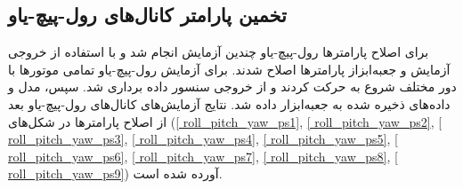 \subsection{تخمین پارامتر کانال‌های رول-پیچ-یاو}
برای اصلاح پارامترها رول-پیچ-یاو چندین آزمایش انجام شد و با استفاده از خروجی آزمایش و جعبه‌ابزاز
پارامترها اصلاح شدند.
برای آزمایش رول-پیچ-یاو تمامی موتورها با دور مختلف شروع به حرکت کردند و از خروجی سنسور داده برداری شد. سپس، مدل و  داده‌های ذخیره شده به جعبه‌ابزار
داده شد. نتایج آزمایش‌های کانال‌های رول-پیچ-یاو بعد از اصلاح پارامترها در شکل‌های
(\ref{ roll_pitch_yaw_ps1}, \ref{ roll_pitch_yaw_ps2}, \ref{ roll_pitch_yaw_ps3}, \ref{ roll_pitch_yaw_ps4}, \ref{ roll_pitch_yaw_ps5}, \ref{ roll_pitch_yaw_ps6}, \ref{ roll_pitch_yaw_ps7}, \ref{ roll_pitch_yaw_ps8}, \ref{ roll_pitch_yaw_ps9})
آورده شده است.


